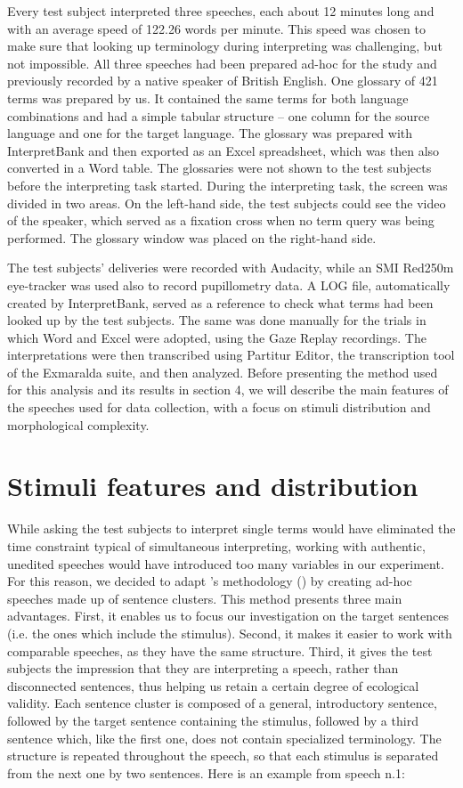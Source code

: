 \documentclass[output=paper]{langsci/langscibook}
\begin{document}
Every test subject interpreted three speeches, each about 12 minutes long and with an average speed of 122.26 words per minute. This speed was chosen to make sure that looking up terminology during interpreting was challenging, but not impossible. All three speeches had been prepared ad-hoc for the study and previously recorded by a native speaker of British English. One glossary of 421 terms was prepared by us. It contained the same terms for both language combinations and had a simple tabular structure – one column for the source language and one for the target language. The glossary was prepared with InterpretBank and then exported as an Excel spreadsheet, which was then also converted in a Word table. The glossaries were not shown to the test subjects before the interpreting task started. During the interpreting task, the screen was divided in two areas. On the left-hand side, the test subjects could see the video of the speaker, which served as a fixation cross when no term query was being performed. The glossary window was placed on the right-hand side.

The test subjects’ deliveries were recorded with Audacity, while an SMI Red250m eye-tracker was used also to record pupillometry data. A LOG file, automatically created by InterpretBank, served as a reference to check what terms had been looked up by the test subjects. The same was done manually for the trials in which Word and Excel were adopted, using the Gaze Replay recordings. The interpretations were then transcribed using Partitur Editor, the transcription tool of the Exmaralda suite, and then analyzed. Before presenting the method used for this analysis and its results in section 4, we will describe the main features of the speeches used for data collection, with a focus on stimuli distribution and morphological complexity.

\section{Stimuli features and distribution}\label{sec:prandi:4}
While asking the test subjects to interpret single terms would have eliminated the time constraint typical of simultaneous interpreting, working with authentic, unedited speeches would have introduced too many variables in our experiment. For this reason, we decided to adapt \citeauthor{Seeber2011a}’s methodology (\citeyear{Seeber2011a}) by creating ad-hoc speeches made up of sentence clusters. This method presents three main advantages. First, it enables us to focus our investigation on the target sentences (i.e. the ones which include the stimulus). Second, it makes it easier to work with comparable speeches, as they have the same structure. Third, it gives the test subjects the impression that they are interpreting a speech, rather than disconnected sentences, thus helping us retain a certain degree of ecological validity. Each sentence cluster is composed of a general, introductory sentence, followed by the target sentence containing the stimulus, followed by a third sentence which, like the first one, does not contain specialized terminology. The structure is repeated throughout the speech, so that each stimulus is separated from the next one by two sentences. Here is an example from speech n.1:
\end{document}
